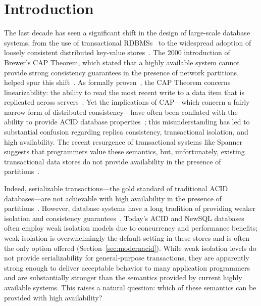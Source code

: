 
\section{Introduction}

The last decade has seen a significant shift in the design of
large-scale database systems, from the use of transactional
RDBMSs~\cite{bernstein-book, gray-isolation, gray-virtues} to the
widespread adoption of loosely consistent distributed key-value
stores~\cite{bigtable, pnuts, dynamo}. The 2000 introduction of
Brewer's CAP Theorem, which stated that a highly available system
cannot provide strong consistency guarantees in the presence of
network partitions, helped spur this shift~\cite{brewer-slides}. As
formally proven~\cite{gilbert-cap}, the CAP Theorem concerns
linearizability: the ability to read the most recent write to a data
item that is replicated across servers~\cite{herlihy-art}. Yet the
implications of CAP---which concern a fairly narrow form of
distributed consistency---have often been conflated with the ability
to provide ACID database properties~\cite{hn,brewer-slides,
  foundation-article}; this misunderstanding has led to substantial
confusion regarding replica consistency, transactional isolation, and
high availability. The recent resurgence of transactional systems like
Spanner~\cite{spanner} suggests that programmers value these
semantics, but, unfortunately, existing transactional data stores do
not provide availability in the presence of
partitions~\cite{middleware-db, foundation-article,
  hstore,spanner,generalizedsnapshot, mdcc, krikellas-bargain, eiger,
  walter, calvin}.

Indeed, serializable transactions---the gold standard of traditional
ACID databases---are not achievable with high availability in the
presence of partitions~\cite{davidson-survey}. However, database
systems have a long tradition of providing weaker isolation and
consistency guarantees~\cite{adya, ansicritique, gray-virtues,
  gray-isolation, kemme-thesis}. Today's ACID and NewSQL databases
often employ weak isolation models due to concurrency and performance
benefits; weak isolation is overwhelmingly the default setting in
these stores and is often the only option offered
(Section~\ref{sec:modernacid}). While weak isolation levels do not
provide serializability for general-purpose transactions, they are
apparently strong enough to deliver acceptable behavior to many
application programmers and are substantially stronger than the
semantics provided by current highly available systems. This raises a
natural question: which of these semantics can be provided with high
availability?

